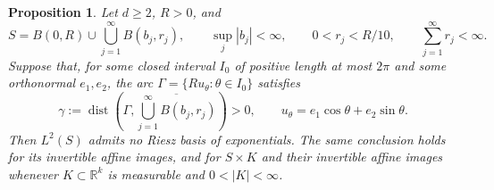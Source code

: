 \documentclass[12pt,reqno,tbtags]{amsart}
\newtheorem{proposition}{Proposition}[section]
\def\R{\mathbb{R}}
\newcommand\1{\mathbbm{1}}
\begin{document}
\begin{proposition}\label{prop:countable-balls}
Let $d\ge2$, $R>0$, and
\begin{equation}\label{eq:countable-ball-set}
    S=B(0,R)\cup\bigcup_{j=1}^{\infty}B(b_j,r_j),
    \qquad \sup_j|b_j|<\infty,\qquad
    0<r_j<R/10,\qquad \sum_{j=1}^{\infty}r_j<\infty.
\end{equation}
Suppose that, for some closed interval $I_0$ of positive length at most
$2\pi$ and some orthonormal $e_1,e_2$, the arc
$\Gamma=\{Ru_\theta:\theta\in I_0\}$ satisfies
\begin{equation}\label{eq:countable-exposed-arc}
    \gamma:=\operatorname{dist}\left(
    \Gamma,\overline{\bigcup_{j=1}^{\infty}B(b_j,r_j)}\right)>0,
    \qquad u_\theta=e_1\cos\theta+e_2\sin\theta.
\end{equation}
Then $L^2(S)$ admits no Riesz basis of exponentials.
The same conclusion holds for its invertible affine images, and for
$S\times K$ and their invertible affine images whenever
$K\subset\R^k$ is measurable and $0<|K|<\infty$.
\end{proposition}
\end{document}
